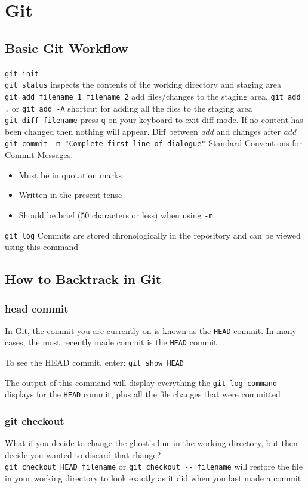 \documentclass[a4paper, 12pt]{article}
\begin{document}
\section{Git}
\subsection{Basic Git Workflow}
\noindent\verb|git init|\\
\verb|git status| inspects the contents of the working directory and staging area\\
\verb|git add filename_1 filename_2| add files/changes to the staging area. \verb|git add .| or \verb|git add -A| shortcut for adding all the files to the staging area \\
\verb|git diff filename| press \verb|q| on your keyboard to exit diff mode. If no content has been changed then nothing will appear. Diff between \textit{add} and changes after \textit{add} \\ 
\verb|git commit -m "Complete first line of dialogue"| Standard Conventions for Commit Messages:
\begin{itemize}
\item Must be in quotation marks
\item Written in the present tense
\item Should be brief (50 characters or less) when using \verb|-m|
\end{itemize}
\verb|git log| Commits are stored chronologically in the repository and can be viewed using this command

\subsection{How to Backtrack in Git}
\subsubsection{head commit}
In Git, the commit you are currently on is known as the \verb|HEAD| commit. In many cases, the most recently made commit is the \verb|HEAD| commit

To see the HEAD commit, enter: \verb|git show HEAD|

The output of this command will display everything the \verb|git log command| displays for the \verb|HEAD| commit, plus all the file changes that were committed

\subsubsection{git checkout}
What if you decide to change the ghost's line in the working directory, but then decide you wanted to discard that change?\\
\verb|git checkout HEAD filename| or \verb|git checkout -- filename| will restore the file in your working directory to look exactly as it did when you last made a commit
\end{document}
